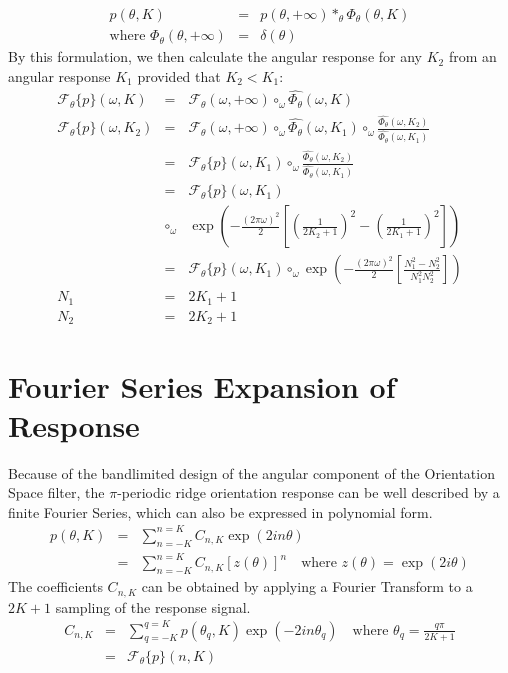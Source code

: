 \documentclass{article}
\begin{document}
\begin{eqnarray}
    p(\theta,K) & = & p(\theta,+\infty) \ast_\theta \Phi_\theta(\theta,K) \\
    \mbox{where } \Phi_\theta(\theta,+\infty) & = & \delta({\theta}) 
\end{eqnarray}
By this formulation, we then calculate the angular response for any $ K_2 $ from an angular response $ K_1 $ provided that $ K_2 < K_1 $:
\begin{eqnarray}
    \mathcal{F}_\theta\{ p \}(\omega,K) & = & \mathcal{F}_\theta(\omega,+\infty) \circ_\omega \widehat{\Phi_\theta}(\omega,K) \\
    \mathcal{F}_\theta\{ p \}(\omega,K_2) & = & \mathcal{F}_\theta(\omega,+\infty) \circ_\omega \widehat{\Phi_\theta}(\omega,K_1) \circ_\omega \frac{ \widehat{\Phi_\theta}(\omega,K_2) }{ \widehat{\Phi_\theta}(\omega,K_1)  } \\
    & = &  \mathcal{F}_\theta\{ p \}(\omega,K_1) \circ_\omega \frac{ \widehat{\Phi_\theta}(\omega,K_2) }{ \widehat{\Phi_\theta}(\omega,K_1)  } \\
    & = & \mathcal{F}_\theta\{ p \}(\omega,K_1) \nonumber\\ 
    & \circ_\omega & \exp\left(- \frac{(2\pi\omega)^2}{2}  \left[ \left(\frac{1}{2K_2+1}\right)^2 - \left(\frac{1}{2K_1+1}\right)^2 \right] \right) \label{eqn:phi_k2_k1} \\
    & = & \mathcal{F}_\theta\{ p \}(\omega,K_1)
    \circ_\omega   \exp\left(- \frac{(2\pi\omega)^2}{2}  \left[ \frac{N_1^2 - N_2^2}{N_1^2 N_2^2} \right] \right) \\
    N_1 & = & 2K_1 + 1 \\
    N_2 & = & 2K_2 + 1 
\end{eqnarray}



\section{Fourier Series Expansion of Response}
Because of the bandlimited design of the angular component of the Orientation Space filter, the $\pi$-periodic ridge orientation response can be well described by a finite Fourier Series, which can also be expressed in polynomial form.
\begin{eqnarray}
    p(\theta,K) & = & \sum_{n=-K}^{n=K} C_{n,K} \exp(2 i n \theta) \\
    & = & \sum_{n=-K}^{n=K} C_{n,K} \left[z(\theta)\right]^n \quad \mbox{where } z(\theta) = \exp(2 i \theta)
\end{eqnarray}
The coefficients $ C_{n,K} $ can be obtained by applying a Fourier Transform to a $ 2K+1 $ sampling of the response signal.
\begin{eqnarray}
    C_{n,K} & = & \sum_{q=-K}^{q=K} p(\theta_q,K) \exp(-2 i n \theta_q) \quad \mbox{where } \theta_q = \frac{q \pi}{2K+1} \\ 
    & = & \mathcal{F}_\theta \{ p \}( n, K)
\end{eqnarray}
\end{document}
